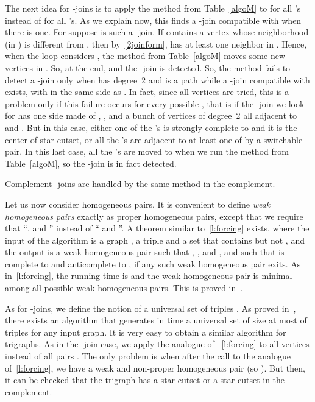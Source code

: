 \documentclass[11 pt] {article}
\newcommand\blackslug{\hbox{\hskip 1pt \vrule width 4pt height 8pt depth 1.5pt
        \hskip 1pt}}
\newcommand\bbox{\hfill \quad \blackslug \medbreak}
\begin{document}
The next idea for -joins is to apply the method from
Table~\ref{algoM} to  for all 's instead of
 for all 's.  As we explain now, this
finds a -join compatible with  when there
is one.  For suppose  is such a -join.  If  contains
a vertex  whose neighborhood (in ) is different from , then by~\ref{2joinform},  has at least one neighbor in
.  Hence, when the loop considers ,
the method from Table~\ref{algoM} moves some new vertices in .  So,
at the end,  and the -join is detected.  So, the method
fails to detect a -join only when  has degree~2 and  is a path while a -join compatible with  exists, with 
in the same side as .  In fact, since all vertices  are
tried, this is a problem only if this failure occurs for every
possible , that is if the -join we look for has one side made of
, , and a bunch of vertices  of degree~2
all adjacent to  and .  But in this case, either one of the
's is strongly complete to  and it is the center of
star cutset, or all the 's are adjacent to at least one of  by a switchable pair.  In this last case, all the 's are
moved to  when we run the method from Table~\ref{algoM}, so the
-join is in fact detected.

Complement -joins are handled by the same method in the complement.

Let us now consider homogeneous pairs.  It is convenient to define
\emph{weak homogeneous pairs} exactly as proper homogeneous pairs,
except that we require that ``,  and '' instead of `` and ''.  A theorem similar
to~\ref{l:forcing} exists, where the input of the algorithm is a graph
, a triple  and a set  that contains  but not , and the output is a weak
homogeneous pair  such that , ,  and , and such that  is
complete to  and anticomplete to , if any such weak homogeneous
pair exits.  As in~\ref{l:forcing}, the running time is  and
the weak homogeneous pair is minimal among all possible weak
homogeneous pairs.  This is proved in~\cite{everett.k.r:findingHP}.

As for -joins, we define the notion of a universal set of triples
.  As proved in~\cite{HaMaMo:HP}, there exists an
algorithm that generates in time  a universal set of size at
most  of triples for any input graph.  It is very easy to
obtain a similar algorithm for trigraphs.  As in the -join case, we
apply the analogue of ~\ref{l:forcing} to all vertices  instead of
all pairs .  The only problem is when after the call to the
analogue of~\ref{l:forcing}, we have a weak and non-proper homogeneous
pair (so ).  But then, it can be checked that the
trigraph has a star cutset or a star cutset in the complement.  \bbox
\end{document}
